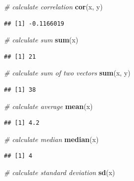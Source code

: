 \documentclass[]{book}
\newenvironment{Shaded}{\begin{snugshade}}{\end{snugshade}}
\newcommand{\KeywordTok}[1]{\textcolor[rgb]{0.13,0.29,0.53}{\textbf{#1}}}
\newcommand{\CommentTok}[1]{\textcolor[rgb]{0.56,0.35,0.01}{\textit{#1}}}
\newcommand{\NormalTok}[1]{#1}
\begin{document}
\begin{Shaded}
\begin{Highlighting}[]
\CommentTok{# calculate correlation}
\KeywordTok{cor}\NormalTok{(x, y)}
\end{Highlighting}
\end{Shaded}

\begin{verbatim}
## [1] -0.1166019
\end{verbatim}

\begin{Shaded}
\begin{Highlighting}[]
\CommentTok{# calculate sum}
\KeywordTok{sum}\NormalTok{(x)}
\end{Highlighting}
\end{Shaded}

\begin{verbatim}
## [1] 21
\end{verbatim}

\begin{Shaded}
\begin{Highlighting}[]
\CommentTok{# calculate sum of two vectors}
\KeywordTok{sum}\NormalTok{(x, y)}
\end{Highlighting}
\end{Shaded}

\begin{verbatim}
## [1] 38
\end{verbatim}

\begin{Shaded}
\begin{Highlighting}[]
\CommentTok{# calculate average}
\KeywordTok{mean}\NormalTok{(x)}
\end{Highlighting}
\end{Shaded}

\begin{verbatim}
## [1] 4.2
\end{verbatim}

\begin{Shaded}
\begin{Highlighting}[]
\CommentTok{# calculate median}
\KeywordTok{median}\NormalTok{(x)}
\end{Highlighting}
\end{Shaded}

\begin{verbatim}
## [1] 4
\end{verbatim}

\begin{Shaded}
\begin{Highlighting}[]
\CommentTok{# calculate standard deviation}
\KeywordTok{sd}\NormalTok{(x)}
\end{Highlighting}
\end{Shaded}
\end{document}

